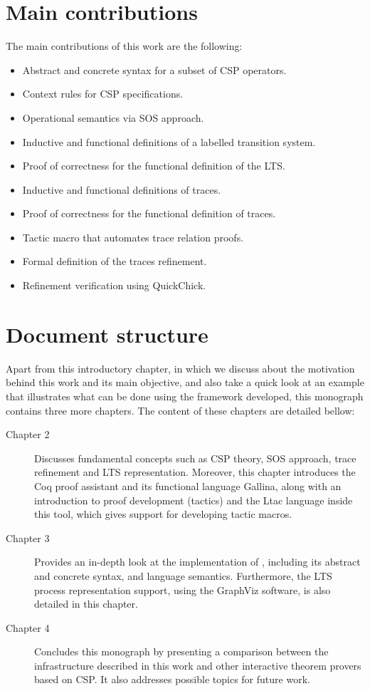 \section{Main contributions}

The main contributions of this work are the following:

\begin{itemize}
	\item Abstract and concrete syntax for a subset of CSP operators.
	\item Context rules for CSP specifications.
	\item Operational semantics via SOS approach.
	\item Inductive and functional definitions of a labelled transition system.
	\item Proof of correctness for the functional definition of the LTS.
	\item Inductive and functional definitions of traces.
	\item Proof of correctness for the functional definition of traces.
	\item Tactic macro that automates trace relation proofs.
	\item Formal definition of the traces refinement.
	\item Refinement verification using QuickChick.
\end{itemize}

\section{Document structure}

Apart from this introductory chapter, in which we discuss about the motivation behind this work and its main objective, and also take a quick look at an example that illustrates what can be done using the framework developed, this monograph contains three more chapters. The content of these chapters are detailed bellow:
\begin{description}
	\item [Chapter 2] Discusses fundamental concepts such as CSP theory, SOS approach, trace refinement and LTS representation. Moreover, this chapter introduces the Coq proof assistant and its functional language Gallina, along with an introduction to proof development (tactics) and the Ltac language inside this tool, which gives support for developing tactic macros.
	\item [Chapter 3] Provides an in-depth look at the implementation of \CSPcoq{}, including its abstract and concrete syntax, and language semantics. Furthermore, the LTS process representation support, using the GraphViz software, is also detailed in this chapter.
	\item [Chapter 4] Concludes this monograph by presenting a comparison between the infrastructure described in this work and other interactive theorem provers based on CSP. It also addresses possible topics for future work.
\end{description}